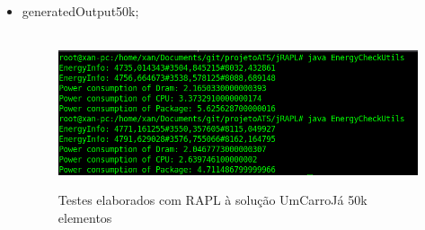 \begin{itemize}
    \item generatedOutput50k;
    
        \begin{figure}[H]
            \hbox{\hspace{-8em} \includegraphics[width=1.5\textwidth]{images/rapl_50k.png}}
            \label{fig55}
            \caption{Testes elaborados com RAPL à solução UmCarroJá 50k elementos}
        \end{figure}
        

\end{itemize}



